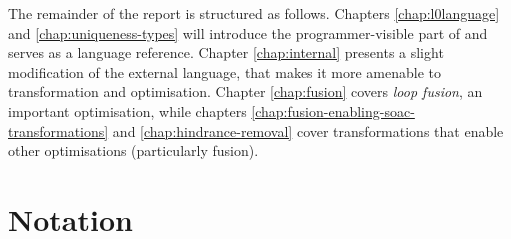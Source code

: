 The remainder of the report is structured as follows.  Chapters
\ref{chap:l0language} and \ref{chap:uniqueness-types} will introduce
the programmer-visible part of \LO{} and serves as a language
reference.  Chapter \ref{chap:internal} presents a slight modification
of the external language, that makes it more amenable to
transformation and optimisation.  Chapter \ref{chap:fusion} covers
\textit{loop fusion}, an important optimisation, while chapters
\ref{chap:fusion-enabling-soac-transformations} and
\ref{chap:hindrance-removal} cover transformations that enable other
optimisations (particularly fusion).

\section{Notation}


